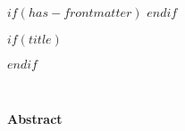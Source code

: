 $if(has-frontmatter)$
\frontmatter
$endif$

$if(title)$
\maketitle
$endif$

\clearpage
\newpage
\thispagestyle{empty} %
\mbox{~}
\clearpage
\newpage


\begin{flushleft}
\huge\textbf{Abstract}
\end{flushleft}

\vspace*{\baselineskip}

